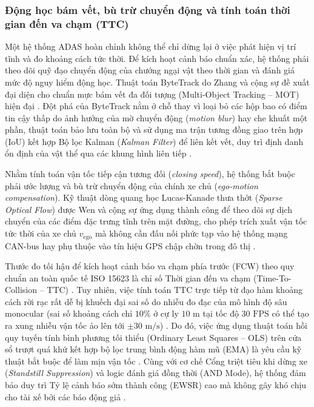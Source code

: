 \documentclass[12pt,a4paper]{article}
\begin{document}
\subsubsection{Động học bám vết, bù trừ chuyển động và tính toán thời gian đến va chạm (TTC)}
Một hệ thống ADAS hoàn chỉnh không thể chỉ dừng lại ở việc phát hiện vị trí tĩnh và đo khoảng cách tức thời. Để kích hoạt cảnh báo chuẩn xác, hệ thống phải theo dõi quỹ đạo chuyển động của chướng ngại vật theo thời gian và đánh giá mức độ nguy hiểm động học. Thuật toán ByteTrack do Zhang và cộng sự đề xuất đại diện cho chuẩn mực bám vết đa đối tượng (Multi-Object Tracking -- MOT) hiện đại \cite{24}. Đột phá của ByteTrack nằm ở chỗ thay vì loại bỏ các hộp bao có điểm tin cậy thấp do ảnh hưởng của mờ chuyển động (\textit{motion blur}) hay che khuất một phần, thuật toán bảo lưu toàn bộ và sử dụng ma trận tương đồng giao trên hợp (IoU) kết hợp Bộ lọc Kalman (\textit{Kalman Filter}) để liên kết vết, duy trì định danh ổn định của vật thể qua các khung hình liên tiếp \cite{24}.

Nhằm tính toán vận tốc tiếp cận tương đối (\textit{closing speed}), hệ thống bắt buộc phải ước lượng và bù trừ chuyển động của chính xe chủ (\textit{ego-motion compensation}). Kỹ thuật dòng quang học Lucas-Kanade thưa thớt (\textit{Sparse Optical Flow}) được Wen và cộng sự ứng dụng thành công để theo dõi sự dịch chuyển của các điểm đặc trưng tĩnh trên mặt đường, cho phép trích xuất vận tốc tức thời của xe chủ $v_{\text{ego}}$ mà không cần đấu nối phức tạp vào hệ thống mạng CAN-bus hay phụ thuộc vào tín hiệu GPS chập chờn trong đô thị \cite{25}.

Thước đo tối hậu để kích hoạt cảnh báo va chạm phía trước (FCW) theo quy chuẩn an toàn quốc tế ISO 15623 là chỉ số Thời gian đến va chạm (Time-To-Collision -- TTC) \cite{26}. Tuy nhiên, việc tính toán TTC trực tiếp từ đạo hàm khoảng cách rời rạc rất dễ bị khuếch đại sai số do nhiễu đo đạc của mô hình độ sâu monocular (sai số khoảng cách chỉ $10\%$ ở cự ly $10\text{ m}$ tại tốc độ $30\text{ FPS}$ có thể tạo ra xung nhiễu vận tốc ảo lên tới $\pm 30\text{ m/s}$) \cite{30}. Do đó, việc ứng dụng thuật toán hồi quy tuyến tính bình phương tối thiểu (Ordinary Least Squares -- OLS) trên cửa sổ trượt quá khứ kết hợp bộ lọc trung bình động hàm mũ (EMA) là yêu cầu kỹ thuật bắt buộc để làm mịn vận tốc \cite{30}. Cùng với cơ chế Cổng triệt tiêu khi dừng xe (\textit{Standstill Suppression}) và logic đánh giá đồng thời (AND Mode), hệ thống đảm bảo duy trì Tỷ lệ cảnh báo sớm thành công (EWSR) cao mà không gây khó chịu cho tài xế bởi các báo động giả \cite{26, 30}.
\end{document}
